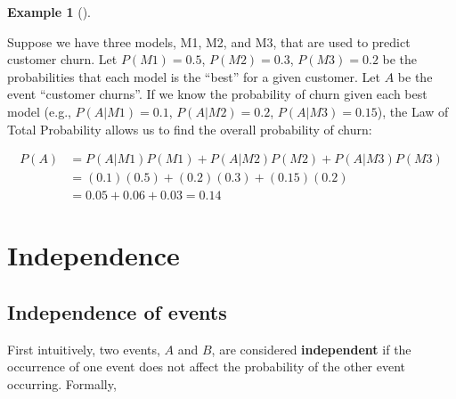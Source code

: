 \documentclass[
  letterpaper,
]{scrbook}
\theoremstyle{definition}
\theoremstyle{plain}
\theoremstyle{plain}
\theoremstyle{definition}
\newtheorem{example}{Example}[chapter]
\theoremstyle{remark}
\begin{document}
\begin{tcolorbox}[enhanced jigsaw, bottomtitle=1mm, coltitle=black, toprule=.15mm, toptitle=1mm, bottomrule=.15mm, colback=white, arc=.35mm, opacityback=0, breakable, title={Customer churn}, titlerule=0mm, rightrule=.15mm, colbacktitle=quarto-callout-note-color!10!white, colframe=quarto-callout-note-color-frame, opacitybacktitle=0.6, leftrule=.75mm, left=2mm]

\begin{example}[]\protect\hypertarget{exm-total-probability-data-science}{}\label{exm-total-probability-data-science}

Suppose we have three models, M1, M2, and M3, that are used to predict
customer churn. Let \(P(M1)=0.5\), \(P(M2)=0.3\), \(P(M3)=0.2\) be the
probabilities that each model is the ``best'' for a given customer. Let
\(A\) be the event ``customer churns''. If we know the probability of
churn given each best model (e.g., \(P(A|M1)=0.1\), \(P(A|M2)=0.2\),
\(P(A|M3)=0.15\)), the Law of Total Probability allows us to find the
overall probability of churn:

\[
\begin{aligned}
P(A) &= P(A|M1)P(M1) + P(A|M2)P(M2) + P(A|M3)P(M3) \\
&= (0.1)(0.5) + (0.2)(0.3) + (0.15)(0.2)\\
& = 0.05 + 0.06 + 0.03 = 0.14
\end{aligned}
\]

\end{example}

\end{tcolorbox}

\section{Independence}\label{independence}

\subsection{Independence of events}\label{independence-of-events}

First intuitively, two events, \(A\) and \(B\), are considered
\textbf{independent} if the occurrence of one event does not affect the
probability of the other event occurring. Formally,
\end{document}

